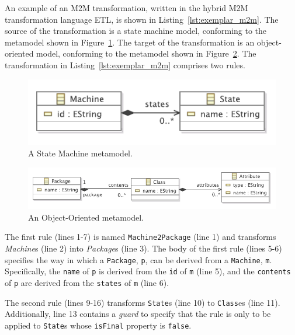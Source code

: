 An example of an M2M transformation, written in the hybrid M2M transformation language ETL, is shown in Listing~\ref{lst:exemplar_m2m}. The source of the transformation is a state machine model, conforming to the metamodel shown in Figure~\ref{fig:state_machine_mm}. The target of the transformation is an object-oriented model, conforming to the metamodel shown in Figure~\ref{fig:object_oriented_mm}. The transformation in Listing~\ref{lst:exemplar_m2m} comprises two rules.

\begin{figure}[htbp]
  \begin{center}
    \leavevmode
    \includegraphics[scale=0.9]{2.Background/images/StateMachines.pdf}
  \end{center}
  \caption{A State Machine metamodel.}
  \label{fig:state_machine_mm}
\end{figure}

\begin{figure}[htbp]
  \begin{center}
    \leavevmode
    \includegraphics[scale=0.9]{2.Background/images/OO.pdf}
  \end{center}
  \caption{An Object-Oriented metamodel.}
  \label{fig:object_oriented_mm}
\end{figure}

The first rule (lines 1-7) is named \texttt{Machine2Package} (line 1) and transforms \emph{Machine}s (line 2) into \emph{Package}s (line 3). The body of the first rule (lines 5-6) specifies the way in which a \texttt{Package}, \texttt{p}, can be derived from a \texttt{Machine}, \texttt{m}. Specifically, the \texttt{name} of \texttt{p} is derived from the \texttt{id} of \texttt{m} (line 5), and the \texttt{contents} of \texttt{p} are derived from the \texttt{states} of \texttt{m} (line 6). 

The second rule (lines 9-16) transforms \texttt{State}s (line 10) to \texttt{Class}es (line 11). Additionally, line 13 contains a \emph{guard} to specify that the rule is only to be applied to \texttt{State}s whose \texttt{isFinal} property is \texttt{false}.

